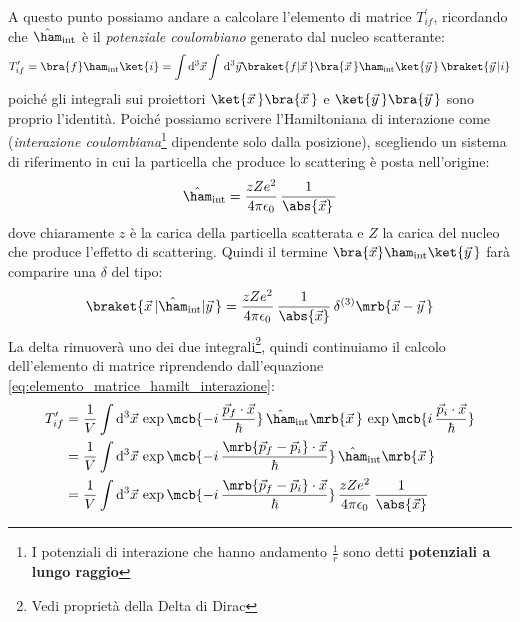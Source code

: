A questo punto possiamo andare a calcolare l'elemento di matrice
$T_{if}^\prime$, ricordando che $\hat{\ham}_{\text{int}}$ è il
\textit{potenziale coulombiano} generato dal nucleo scatterante:
\begin{equation}
	T_{if}^\prime = \bra{f}\ham_{\text{int}}\ket{i} = \int \mathrm{d}^3\vec{x}
	\int \, \mathrm{d}^3\vec{y} \braket{f\vert\vec{x}\,}
	\bra{\vec{x}\,}\ham_{\text{int}} \ket{\vec{y}\,} \, \braket{\vec{y}\,\vert i}
	\label{eq:elemento_matrice_hamilt_interazione}
\end{equation}
poiché gli integrali sui proiettori $\ket{\vec{x}\,}\bra{\vec{x}\,}$ e
$\ket{\vec{y}\,}\bra{\vec{y}\,}$ sono proprio l'identità. Poiché possiamo
scrivere l'Hamiltoniana di interazione come (\textit{interazione
	coulombiana}\footnote{
	I potenziali di interazione che hanno andamento $\frac{1}{r}$ sono detti
	\textbf{potenziali a lungo raggio}
} dipendente solo dalla posizione),
scegliendo un sistema di riferimento in cui la particella che produce lo
scattering è posta nell'origine:
\begin{equation}
	\hat{\ham}_{\text{int}} = \frac{zZe^2}{4\pi\epsilon_0} \,
	\frac{1}{\abs{\vec{x}}\,}
	\label{eq:ham_int_puntiforme}
\end{equation}
dove chiaramente $z$ è la carica della particella scatterata e $Z$ la carica
del nucleo che produce l'effetto di scattering.
Quindi il termine $\bra{\vec{x}}\ham_{\text{int}}\ket{\vec{y}\,}$ farà
comparire una $\delta$ del tipo:
\begin{equation}
	\braket{\vec{x}\, \vert \hat{\ham} _{\text{int}} \vert \vec{y}\,} =
	\frac{zZe^2}{4\pi\epsilon_0} \, \frac{1}{\abs{\vec{x}}} \, \delta^{(3)}
	\mrb{\vec{x} - \vec{y}\,}
\end{equation}
La delta rimuoverà uno dei due integrali\footnote{Vedi proprietà della Delta di
	Dirac}, quindi continuiamo il calcolo dell'elemento di matrice riprendendo
dall'equazione \ref{eq:elemento_matrice_hamilt_interazione}:
\begin{equation}
	\begin{split}
		T_{if}^\prime & = \frac{1}{V} \int \mathrm{d}^3\vec{x} \, \exp{\mcb{-i \,
				\frac{\vec{p}_f\cdot\vec{x}}{\hbar}}} \,
		\hat{\ham}_{\text{int}}\mrb{\vec{x}\,} \, \exp{\mcb{i \,
				\frac{\vec{p}_i\cdot\vec{x}}{\hbar}}} \\
		& = \frac{1}{V} \int \mathrm{d}^3\vec{x} \,  \exp\mcb{-i \,
			\frac{\mrb{\vec{p}_f-\vec{p}_i}\cdot\vec{x}}{\hbar}} \,
		\hat{\ham}_{\text{int}}\mrb{\vec{x}\,} \\
		& = \frac{1}{V} \int \mathrm{d}^3\vec{x} \,  \exp\mcb{-i \,
			\frac{\mrb{\vec{p}_f-\vec{p}_i}\cdot\vec{x}}{\hbar}} \,
		\frac{zZe^2}{4\pi\epsilon_0} \, \frac{1}{\abs{\vec{x}}}
	\end{split}
\end{equation}
